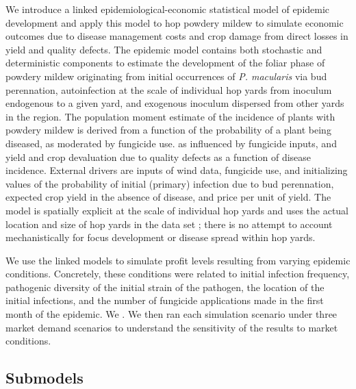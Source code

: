 \documentclass[10pt,a4paper]{article}
\begin{document}
We introduce a linked epidemiological-economic statistical model of epidemic development and apply this model to hop powdery mildew to simulate economic outcomes due to disease management costs and crop damage from direct losses in yield and quality defects. The epidemic model contains both stochastic and deterministic components to estimate the development of the foliar phase of powdery mildew originating from initial occurrences of \textit{P. macularis} via bud perennation, autoinfection at the scale of individual hop yards from inoculum endogenous to a given yard, and exogenous inoculum dispersed from other yards in the region. The population moment estimate of the incidence of plants with powdery mildew is derived from a function of the probability of a plant being diseased, as moderated by fungicide use.  as influenced by fungicide inputs, and yield and crop devaluation due to quality defects as a function of disease incidence. External drivers are inputs of wind data, fungicide use, and initializing values of the probability of initial (primary) infection due to bud perennation, expected crop yield in the absence of disease, and price per unit of yield. The model is spatially explicit at the scale of individual hop yards and uses the actual location and size of hop yards in the data set ; there is no attempt to account mechanistically for focus development or disease spread within hop yards.

We use the linked models to simulate profit levels resulting from varying epidemic conditions. Concretely, these conditions were related to initial infection frequency, pathogenic diversity of the initial strain of the pathogen, the location of the initial infections, and the number of fungicide applications made in the first month of the epidemic. We . We then ran each simulation scenario under three market demand scenarios to understand the sensitivity of the results to market conditions.

\subsection{Submodels}
\end{document}
